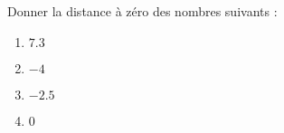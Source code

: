
\begin{exercice}\label{exosmath-0726}

    Donner la distance à zéro des nombres suivants :
    \begin{enumerate}
        \item
            \( 7.3\)
        \item
            \( -4\)
        \item
            \( -2.5\)
        \item
            \( 0\)
    \end{enumerate}

\end{exercice}
